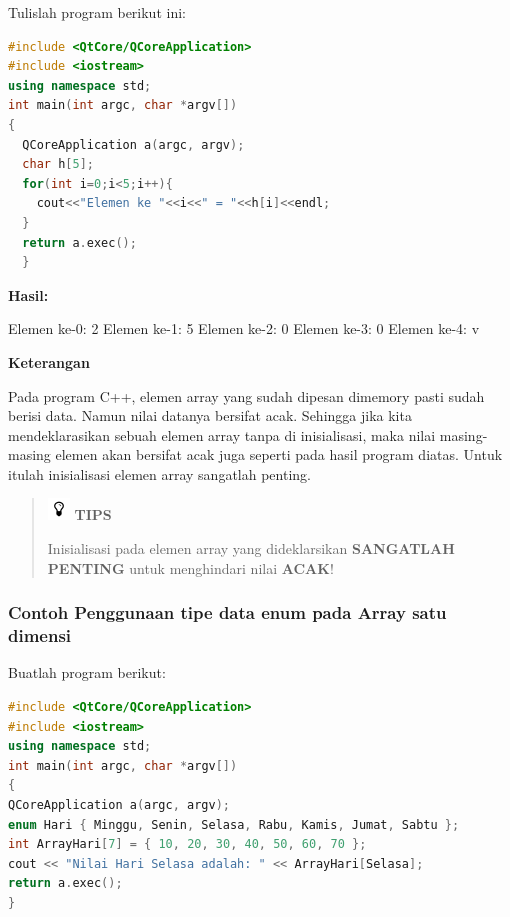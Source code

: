 Tulislah program berikut ini:

\begin{lstlisting}[language=c++, caption=Tanpa inisialisasi array langsung ditampilkan, label=contoh3-6]
#include <QtCore/QCoreApplication>
#include <iostream>
using namespace std;
int main(int argc, char *argv[])
{
  QCoreApplication a(argc, argv);
  char h[5];
  for(int i=0;i<5;i++){
    cout<<"Elemen ke "<<i<<" = "<<h[i]<<endl;
  }
  return a.exec();
  }
\end{lstlisting}

\textbf{Hasil:}

\begin{lcverbatim}
Elemen ke-0: 2
Elemen ke-1: 5
Elemen ke-2: 0
Elemen ke-3: 0
Elemen ke-4: v
\end{lcverbatim}

\textbf{Keterangan}

Pada program C++, elemen array yang sudah dipesan dimemory pasti sudah
berisi data. Namun nilai datanya bersifat acak. Sehingga jika kita
mendeklarasikan sebuah elemen array tanpa di inisialisasi, maka nilai
masing-masing elemen akan bersifat acak juga seperti pada hasil program
diatas. Untuk itulah inisialisasi elemen array sangatlah penting.

\begin{quotation}
\includegraphics{../manuscript/images/tips.png} \textbf{TIPS}
 
 Inisialisasi pada elemen array yang dideklarsikan \textbf{SANGATLAH
 PENTING} untuk menghindari nilai \textbf{ACAK}!
\end{quotation}


\subsubsection*{Contoh  Penggunaan tipe data enum pada Array satu dimensi}

Buatlah program berikut:

\begin{lstlisting}[language=c++, caption=Penggunaan tipe data enum pada Array satu dimensi, label=contoh3-7]
#include <QtCore/QCoreApplication>
#include <iostream>
using namespace std;
int main(int argc, char *argv[])
{
QCoreApplication a(argc, argv);
enum Hari { Minggu, Senin, Selasa, Rabu, Kamis, Jumat, Sabtu };
int ArrayHari[7] = { 10, 20, 30, 40, 50, 60, 70 };
cout << "Nilai Hari Selasa adalah: " << ArrayHari[Selasa];
return a.exec();
}
\end{lstlisting}

